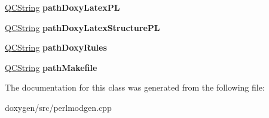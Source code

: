 \begin{DoxyCompactItemize}
\mbox{\label{class_perl_mod_generator_a23cafbc784eadd8d96ea498c07ee1b22}} 
\mbox{\hyperlink{class_q_c_string}{Q\+C\+String}} {\bfseries path\+Doxy\+Latex\+PL}
\item 
\mbox{\label{class_perl_mod_generator_a8dd402f31f1312093ec503a733a5c691}} 
\mbox{\hyperlink{class_q_c_string}{Q\+C\+String}} {\bfseries path\+Doxy\+Latex\+Structure\+PL}
\item 
\mbox{\label{class_perl_mod_generator_a5b043201cbf4b5840582794d44bdcafb}} 
\mbox{\hyperlink{class_q_c_string}{Q\+C\+String}} {\bfseries path\+Doxy\+Rules}
\item 
\mbox{\label{class_perl_mod_generator_a2a2147107f3c1812beb023cb68a10c55}} 
\mbox{\hyperlink{class_q_c_string}{Q\+C\+String}} {\bfseries path\+Makefile}
\end{DoxyCompactItemize}


The documentation for this class was generated from the following file\+:\begin{DoxyCompactItemize}
\item 
doxygen/src/perlmodgen.\+cpp\end{DoxyCompactItemize}

